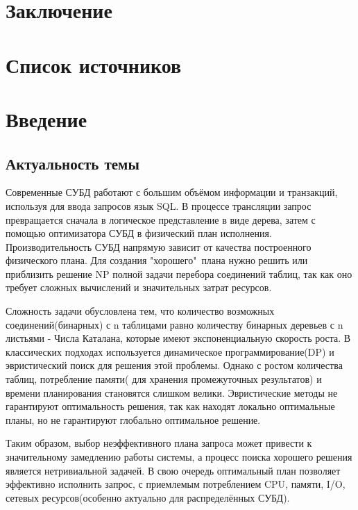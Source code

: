 \documentclass[12pt]{article}
\begin{document}
\begin{flushleft}
\section*{Заключение}

\section*{Список источников}
\newpage
\centering    \section*{Введение}
\centering    \subsection*{Актуальность темы}
\raggedright

Современные СУБД работают с большим объёмом информации и транзакций, используя для ввода запросов язык SQL. 
В процессе трансляции запрос превращается сначала в логическое представление в виде дерева, 
затем с помощью оптимизатора СУБД в физический план исполнения. Производительность СУБД напрямую зависит от качества
построенного физического плана. Для создания "хорошего"\ плана нужно решить или приблизить решение
NP полной задачи перебора соединений таблиц, так как оно требует сложных вычислений и значительных затрат ресурсов.

Сложность задачи обусловлена тем, что количество возможных соединений(бинарных) с n таблицами
равно количеству бинарных деревьев с n листьями - Числа Каталана, которые
имеют экспоненциальную скорость роста.
В классических подходах используется динамическое программирование(DP)
и эвристический поиск для решения этой проблемы. Однако с ростом количества таблиц,
потребление памяти( для хранения промежуточных результатов) и времени планирования становятся
слишком велики. Эвристические методы не гарантируют оптимальность решения, так как
находят локально оптимальные планы, но не гарантируют глобально оптимальное решение.

Таким образом, выбор неэффективного плана запроса может привести
к значительному замедлению работы системы, а процесс поиска хорошего решения является
нетривиальной задачей. В свою очередь оптимальный план позволяет эффективно исполнить
запрос, с приемлемым потреблением CPU, памяти, I/O, сетевых ресурсов(особенно актуально
для распределённых СУБД).



\end{flushleft}
\end{document}
